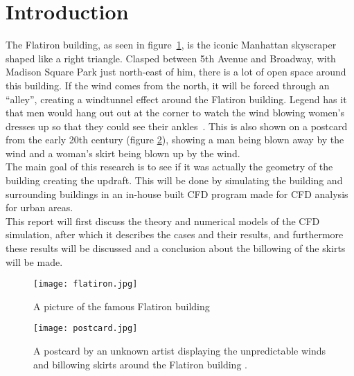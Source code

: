 \section{Introduction}
\label{intro}
The Flatiron building, as seen in figure~\ref{fig:flatiron}, is the iconic Manhattan skyscraper shaped like a right triangle. Clasped between 5th Avenue and Broadway, with Madison Square Park just north-east of him, there is a lot of open space around this building. If the wind comes from the north, it will be forced through an ``alley'', creating a windtunnel effect around the Flatiron building. Legend has it that men would hang out out at the corner to watch the wind blowing women's dresses up so that they could see their ankles~\cite{dresses}. This is also shown on a postcard from the early 20th century (figure \ref{fig:postalcard}), showing a man being blown away by the wind and a woman's skirt being blown up by the wind.  \\
\indent The main goal of this research is to see if it was actually the geometry of the building creating the updraft. This will be done by simulating the building and surrounding buildings in an in-house built CFD program made for CFD analysis for urban areas. \\
\indent This report will first discuss the theory and numerical models of the CFD simulation, after which it describes the cases and their results, and furthermore these results will be discussed and a conclusion about the billowing of the skirts will be made.
\begin{figure}[h!]
\centering
\texttt{[image: flatiron.jpg]}
\caption{A picture of the famous Flatiron building}
\label{fig:flatiron}
\end{figure}
\begin{figure}[h!]
\centering
\texttt{[image: postcard.jpg]}
\caption{A postcard by an unknown artist displaying the unpredictable winds and billowing skirts around the Flatiron building \cite{postalcard}.}
\label{fig:postalcard}
\end{figure}